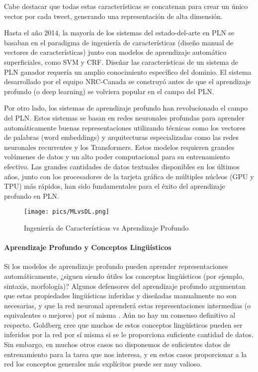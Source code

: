 Cabe destacar que todas estas características se concatenan para crear un único vector por cada tweet, generando una representación de alta dimensión.

Hasta el año 2014, la mayoría de los sistemas del estado-del-arte en PLN se basaban en el paradigma de ingeniería de características (diseño manual de vectores de características) junto con modelos de aprendizaje automático superficiales, como SVM y CRF. Diseñar las características de un sistema de PLN ganador requería un amplio conocimiento específico del dominio. El sistema desarrollado por el equipo NRC-Canada se construyó antes de que el aprendizaje profundo (o deep learning) se volviera popular en el campo del PLN. 

Por otro lado, los sistemas de aprendizaje profundo han revolucionado el campo del PLN. Estos sistemas se basan en redes neuronales profundas para aprender automáticamente buenas representaciones utilizando técnicas como los vectores de palabras (word embeddings) y arquitecturas especializadas como las redes neuronales recurrentes y los Transformers. Estos modelos requieren grandes volúmenes de datos y un alto poder computacional para su entrenamiento efectivo. Las grandes cantidades de datos textuales disponibles en los últimos años, junto con los procesadores de la tarjeta gráfica de múltiples núcleos (GPU y TPU) más rápidos, han sido fundamentales para el éxito del aprendizaje profundo en PLN.

\begin{figure}[h]
	\centering
	\texttt{[image: pics/MLvsDL.png]}
	\caption{Ingeniería de Características vs Aprendizaje Profundo}
	\label{fig:MLvsDL}
\end{figure}

\paragraph{Aprendizaje Profundo y Conceptos Lingüísticos}
Si los modelos de aprendizaje profundo pueden aprender representaciones automáticamente, ¿siguen siendo útiles los conceptos lingüísticos (por ejemplo, sintaxis, morfología)? Algunos defensores del aprendizaje profundo argumentan que estas propiedades lingüísticas inferidas y diseñadas manualmente no son necesarias, y que la red neuronal aprenderá estas representaciones intermedias (o equivalentes o mejores) por sí misma \cite{goldberg2016primer}. Aún no hay un consenso definitivo al respecto. Goldberg cree que muchos de estos conceptos lingüísticos pueden ser inferidos por la red por sí misma si se le proporciona suficiente cantidad de datos. Sin embargo, en muchos otros casos no disponemos de suficientes datos de entrenamiento para la tarea que nos interesa, y en estos casos proporcionar a la red los conceptos generales más explícitos puede ser muy valioso.


